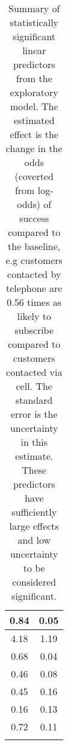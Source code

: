 \documentclass[9pt]{article}
\begin{document}
\begin{longtable}{|c|c|}
            \hline
            0.84 & 0.05 \\

            \hline
            4.18 & 1.19 \\

            \hline
            0.68 & 0.04 \\
            0.46 & 0.08 \\
            0.45 & 0.16 \\
            0.16 & 0.13 \\

            \hline
            0.72 & 0.11 \\
            \hline
    
    \caption{Summary of statistically significant linear predictors from the exploratory model. The estimated effect is the change in the odds (coverted from log-odds) of success compared to the baseline, e.g customers contacted by telephone are 0.56 times as likely to subscribe compared to customers contacted via cell. The standard error is the uncertainty in this estimate. These predictors have sufficiently large effects and low uncertainty to be considered significant.}

    \label{table:gam_summary}
\end{longtable}
\end{document}
